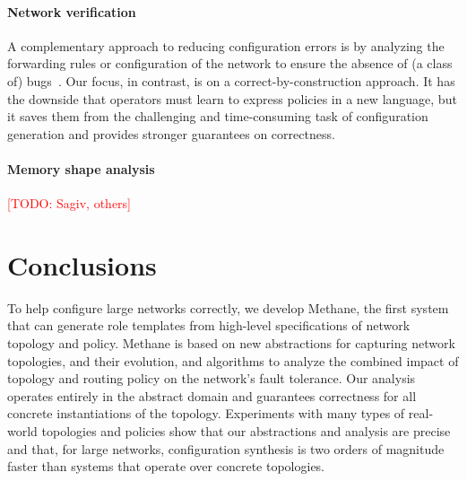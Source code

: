 \documentclass[numbers, 10pt, preprint]{sigplanconf}
\newcommand{\todo}[1]{\textcolor{red}{[TODO: #1]}}
\newcommand{\sysname}{{\small \sf Methane}\xspace}
\newcommand{\para}[1]{\paragraph*{\textbf{#1}}}
\begin{document}
\para{Network verification}
A complementary approach to reducing configuration errors is by analyzing the forwarding rules or configuration of the network to ensure the absence of (a class of) bugs~\cite{anteater,hsa,feamster+:rcc,ipassure,batfish,bagpipe,arc,era,symmetries}. Our focus, in contrast, is on a correct-by-construction approach. It has the downside that operators must learn to express policies in a new language, but it saves them from the challenging and time-consuming task of configuration generation and provides stronger guarantees on correctness.

\para{Memory shape analysis} \todo{Sagiv, others}




%
%
%
%

\section{Conclusions}
\label{sec:conclusions}

To help configure large networks correctly, we develop \sysname, the first system that can generate role templates from high-level specifications of network topology and policy. \sysname is based on new abstractions for capturing network topologies, and their evolution, and algorithms to analyze the combined impact of topology and routing policy on the network's fault tolerance. Our analysis operates entirely in the abstract domain and guarantees correctness for all concrete instantiations of the topology. Experiments with many types of real-world topologies and policies show that our abstractions and analysis are precise and that, for large networks, configuration synthesis is two orders of magnitude faster than systems that operate over concrete topologies.
\end{document}
